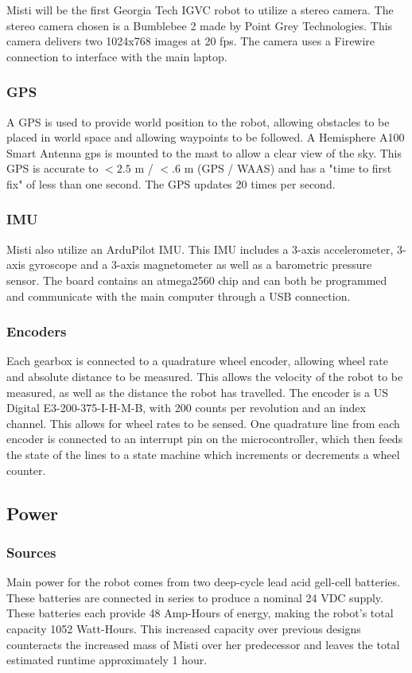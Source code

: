 Misti will be the first Georgia Tech IGVC robot to utilize a stereo camera. The stereo camera chosen is a Bumblebee 2 made by Point Grey Technologies. This camera delivers two 1024x768 images at 20 fps. The camera uses a Firewire connection to interface with the main laptop. 

\subsubsection{GPS}

A GPS is used to provide world position to the robot, allowing obstacles to be placed in world space and allowing waypoints to be followed. A Hemisphere A100 Smart Antenna gps is mounted to the mast to allow a clear view of the sky. This GPS is accurate to $<2.5$ m / $<.6$ m (GPS / WAAS) and has a "time to first fix" of less than one second. The GPS updates 20 times per second.

\subsubsection{IMU}

Misti also utilize an ArduPilot IMU. This IMU includes a 3-axis accelerometer, 3-axis gyroscope and a 3-axis magnetometer as well as a barometric pressure sensor. The board contains an atmega2560 chip and can both be programmed and communicate with the main computer through a USB connection.
 
\subsubsection{Encoders}

Each gearbox is connected to a quadrature wheel encoder, allowing wheel rate and absolute distance to be measured. This allows the velocity of the robot to be measured, as well as the distance the robot has travelled. The encoder is a US Digital E3-200-375-I-H-M-B, with 200 counts per revolution and an index channel. This allows for wheel rates to be sensed. One quadrature line from each encoder is connected to an interrupt pin on the microcontroller, which then feeds the state of the lines to a state machine which increments or decrements a wheel counter.

\subsection {Power}

\subsubsection{Sources}
Main power for the robot comes from two deep-cycle lead acid gell-cell batteries. These batteries are
 connected in series to produce a nominal 24 VDC supply. These batteries each provide 48 Amp-Hours of energy, making the robot's total capacity 1052 Watt-Hours. This increased capacity over previous designs counteracts the increased mass of Misti over her predecessor and leaves the total estimated runtime approximately 1 hour.

